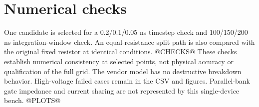 \documentclass[a4paper,10pt]{article}
\begin{document}
\section{Numerical checks}
One candidate is selected for a 0.2/0.1/0.05 ns timestep check and
100/150/200 ns integration-window check. An equal-resistance split path is
also compared with the original fixed resistor at identical conditions.
@CHECKS@
These checks establish numerical consistency at selected points, not
physical accuracy or qualification of the full grid. The vendor model has
no destructive breakdown behavior. High-voltage failed cases remain in the
CSV and figures. Parallel-bank gate impedance and current sharing are not
represented by this single-device bench.
@PLOTS@
\end{document}
